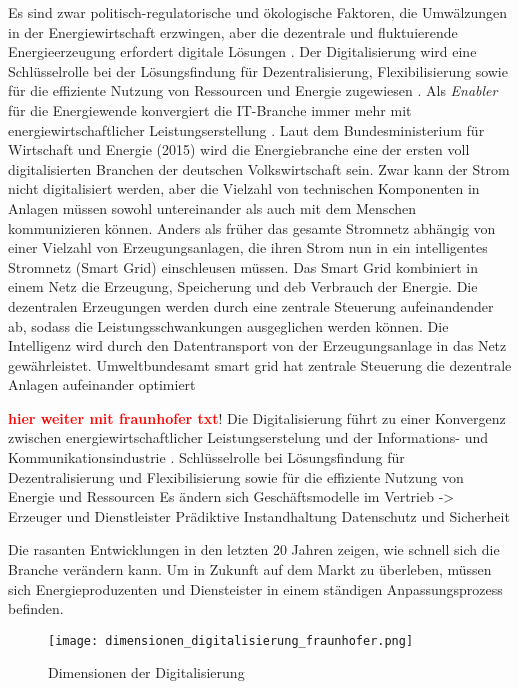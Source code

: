 \noindent Es sind zwar politisch-regulatorische und ökologische Faktoren, die Umwälzungen in der Energiewirtschaft erzwingen, aber die dezentrale und fluktuierende Energieerzeugung erfordert digitale Lösungen \citep{Doleski2017}. Der Digitalisierung wird eine Schlüsselrolle bei der Lösungsfindung für Dezentralisierung, Flexibilisierung sowie für die effiziente Nutzung von Ressourcen und Energie zugewiesen \citep{FraunhoferISE}. Als \textit{Enabler} für die Energiewende konvergiert die IT-Branche immer mehr mit energiewirtschaftlicher Leistungserstellung \citep{Doleski2015}. Laut dem Bundesministerium für Wirtschaft und Energie (2015) wird die Energiebranche eine der ersten voll digitalisierten Branchen der deutschen Volkswirtschaft sein. Zwar kann der Strom nicht digitalisiert werden, aber die Vielzahl von technischen Komponenten in Anlagen müssen sowohl untereinander als auch mit dem Menschen kommunizieren können. Anders als früher das gesamte Stromnetz abhängig von einer Vielzahl von Erzeugungsanlagen, die ihren Strom nun in ein intelligentes Stromnetz (Smart Grid) einschleusen müssen. Das Smart Grid kombiniert in einem Netz die Erzeugung, Speicherung und deb Verbrauch der Energie. Die dezentralen Erzeugungen werden durch eine zentrale Steuerung aufeinandender ab, sodass die Leistungsschwankungen ausgeglichen werden können. Die Intelligenz wird durch den Datentransport von der Erzeugungsanlage in das Netz gewährleistet. Umweltbundesamt
smart grid hat zentrale Steuerung die dezentrale Anlagen aufeinander optimiert

\textcolor{red}{\textbf{hier weiter mit fraunhofer txt}}!  Die Digitalisierung führt zu einer Konvergenz zwischen energiewirtschaftlicher Leistungserstelung und der Informations- und Kommunikationsindustrie \citep{Doleski2015}.
Schlüsselrolle bei Lösungsfindung für Dezentralisierung und Flexibilisierung sowie für die effiziente Nutzung von Energie und Ressourcen \citep{FraunhoferISE}
Es ändern sich Geschäftsmodelle im Vertrieb -> Erzeuger und Dienstleister
Prädiktive Instandhaltung
Datenschutz und Sicherheit


Die rasanten Entwicklungen in den letzten 20 Jahren zeigen, wie schnell sich die Branche verändern kann. Um in Zukunft auf dem Markt zu überleben, müssen sich Energieproduzenten und Diensteister in einem ständigen Anpassungsprozess befinden.


\begin{figure}[h]
  \texttt{[image: dimensionen\_digitalisierung\_fraunhofer.png]}
  \caption[Dimensionen der Digitalisierung]{Dimensionen der Digitalisierung \citep{FraunhoferISE}}
\end{figure}


